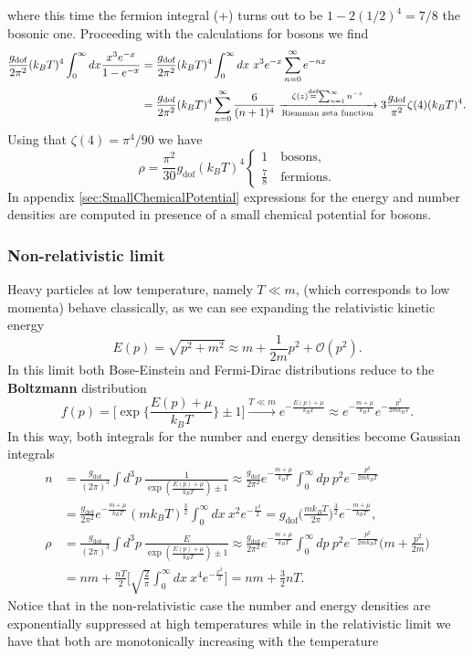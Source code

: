         where this time the fermion integral (+) turns out to be $1-2(1/2)^4=7/8$ the bosonic one. Proceeding with the calculations for bosons we find
\begin{align*}
   \frac{g_\text{dof}}{2\pi^2}(k_BT)^4\int_{0}^{\infty}dx\frac{x^3e^{-x}}{1-e^{-x}}  &=\frac{g_\text{dof}}{2\pi^2}(k_BT)^4\int_0^\infty dx\ x^3e^{-x}\sum_{n=0}^{\infty} e^{-nx}\nonumber\\&=\frac{g_\text{dof}}{2\pi^2}(k_BT)^4\sum_{n=0}^{\infty}\frac{6}{(n+1)^4}\xrightarrow[\text{Riemman zeta function}]{\zeta(z)\stackrel{\text{def}}{=}\sum_{n=1}^\infty n^{-z}}3\frac{g_\text{dof}}{\pi^2}\zeta(4)(k_BT)^4.
\end{align*}
Using that $\zeta(4)=\pi^4/90$ we have
\begin{equation}
    \rho=\frac{\pi^2}{30}g_\text{dof}(k_BT)^4\begin{cases}
        1\quad \text{bosons},\\
        \frac{7}{8}\quad \text{fermions.}
    \end{cases}
    \label{eq:relativistic_energy_density}
\end{equation}
In appendix \ref{sec:SmallChemicalPotential} expressions for the energy and number densities are computed in presence of a small chemical potential for bosons. 
\subsubsection{Non-relativistic limit}
Heavy particles at low temperature, namely $T\ll m$, (which corresponds to low momenta) behave classically, as we can see expanding the relativistic kinetic energy
$$
E(p)=\sqrt{p^2+m^2}\approx m+ \frac{1}{2m}p^2+\mathcal{O}(p^2).
$$ 
In this limit both Bose-Einstein and Fermi-Dirac distributions reduce to the \textbf{Boltzmann} distribution
$$
f(p)=\bigg[\exp\bigg\{\frac{E(p)+\mu}{k_BT}\bigg\}\pm1\bigg]\xrightarrow{T\ll m}e^{-\frac{E(p)+\mu}{k_BT}}\approx e^{-\frac{m+\mu}{k_BT}}e^{-\frac{p^2}{2mk_BT}}.
$$
In this way, both integrals for the number and energy densities become Gaussian integrals
\begin{align}
    n&=\frac{g_\text{dof}}{(2\pi)^3}\int d^3p\ \frac{1}{\exp(\frac{E(p)+\mu}{k_BT})\pm1}\approx\frac{g_\text{dof}}{2\pi^2}e^{-\frac{m+\mu}{k_BT}}\int_{0}^{\infty}dp\ p^2  e^{-\frac{p^2}{2mk_BT}}\nonumber\\
    &=\frac{g_\text{dof}}{2\pi^2}e^{-\frac{m+\mu}{k_BT}}(mk_BT)^{\frac{3}{2}}\int_{0}^{\infty}dx\ x^2  e^{-\frac{x^2}{2}}=g_\text{dof}\bigg(\frac{mk_BT}{2\pi}\bigg)^{\frac{3}{2}}e^{-\frac{m+\mu}{k_BT}},\label{eq:nonrel_number_density}\\
    \rho&=\frac{g_\text{dof}}{(2\pi)^3}\int d^3p\ \frac{E}{\exp(\frac{E(p)+\mu}{k_BT})\pm1}\approx\frac{g_\text{dof}}{2\pi^2}e^{-\frac{m+\mu}{k_BT}}\int_{0}^{\infty}dp\ p^2  e^{-\frac{p^2}{2mk_BT}}\bigg(m+\frac{p^2}{2m}\bigg)\nonumber\\
    &=nm+\frac{nT}{2}\bigg[\sqrt{\frac{2}{\pi}}\int_{0}^{\infty}dx\ x^4  e^{-\frac{x^2}{2}}\bigg]=nm+\frac{3}{2}nT.
\end{align}
Notice that in the non-relativistic case the number and energy densities are exponentially suppressed at high temperatures while in the relativistic limit we have that both are monotonically increasing with the temperature
